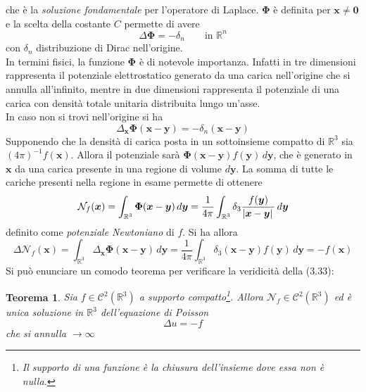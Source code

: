 \documentclass[a4paper,12pt, draft]{article}
\theoremstyle{break}
\newtheorem{theorem}{Teorema}[section]
\numberwithin{equation}{section}
\begin{document}
che è la \emph{soluzione fondamentale} per l'operatore di Laplace. \(\bm{\Phi}\) è definita per \(\bm{x} \not = \bm{0}\) e la scelta della costante \(C\) permette di avere 
\[
  \Delta \bm{\Phi} = -\delta_n \qquad \mbox{in }\mathbb{R}^n
\]
con \(\delta_n\) distribuzione di Dirac nell'origine. \\
In termini fisici, la funzione \(\bm{\Phi}\) è di notevole importanza. Infatti in tre dimensioni rappresenta il potenziale elettrostatico generato da una carica nell'origine che si annulla all'infinito, mentre in due dimensioni rappresenta il potenziale di una carica con densità totale unitaria distribuita lungo un'asse. \\
In caso non si trovi nell'origine si ha 
\[
  \Delta_{\bm{x}} \bm{\Phi}(\bm{x} - \bm{y}) = -\delta_n (\bm{x} - \bm{y})
\]
Supponendo che la densità di carica posta in un sottoinsieme compatto di \(\mathbb{R}^3\) sia \((4\pi)^{-1} f(\bm{x})\). Allora il potenziale sarà \(\bm{\Phi}(\bm{x} - \bm{y}) f(\bm{y}) \, d\bm{y}\), che è generato in \(\bm{x}\) da una carica presente in una regione di volume \(d\bm{y}\). La somma di tutte le cariche presenti nella regione in esame permette di ottenere
\begin{equation}
  \mathcal{N}_f (\bm{x}) = \int_{\mathbb{R}^3} \bm{\Phi} (\bm{x} - \bm{y}) \, d\bm{y} = \frac{1}{4\pi} \int_{\mathbb{R}^3} \delta_3 \frac{f(\bm{y})}{\abs*{\bm{x}-\bm{y}}}\, d\bm{y}
\end{equation}
definito come \emph{potenziale Newtoniano} di \(f\). Si ha allora
\begin{equation}
  \Delta \mathcal{N}_f (\bm{x}) = \int_{\mathbb{R}^3} \Delta_{\bm{x}}\bm{\Phi} (\bm{x} - \bm{y}) \, d\bm{y} = \frac{1}{4\pi} \int_{\mathbb{R}^3} \delta_3 (\bm{x}- \bm{y}) f(\bm{y}) \, d\bm{y} = -f(\bm{x})
\end{equation}
Si può enunciare un comodo teorema per verificare la veridicità della (3.33):
\begin{theorem}
  Sia \(f \in \mathcal{C}^2 (\mathbb{R}^3)\) a supporto compatto\footnote{Il supporto di una funzione è la \emph{chiusura dell'insieme} dove essa non è nulla.}. Allora \(\mathcal{N}_f \in \mathcal{C}^2 (\mathbb{R}^3)\) ed è unica soluzione in \(\mathbb{R}^3\) dell'equazione di Poisson
  \[
    \Delta u = -f
  \]
  che si annulla \(\to \infty\)
\end{theorem}
\end{document}
